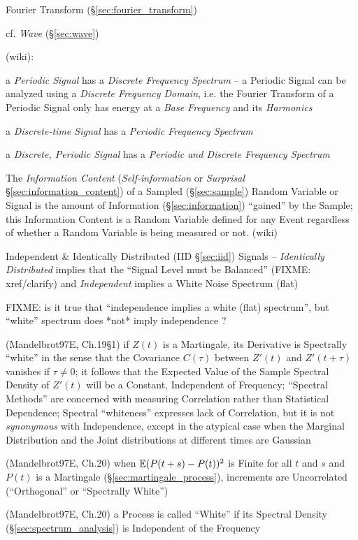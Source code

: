 \fist Fourier Transform (\S\ref{sec:fourier_transform})

cf. \emph{Wave} (\S\ref{sec:wave})

(wiki):

a \emph{Periodic Signal} has a \emph{Discrete Frequency Spectrum} -- a Periodic
Signal can be analyzed using a \emph{Discrete Frequency Domain}, i.e. the
Fourier Transform of a Periodic Signal only has energy at a \emph{Base
  Frequency} and its \emph{Harmonics}

a \emph{Discrete-time Signal} has a \emph{Periodic Frequency Spectrum}

a \emph{Discrete, Periodic Signal} has a \emph{Periodic and Discrete Frequency
  Spectrum}

The \emph{Information Content} (\emph{Self-information} or \emph{Surprisal}
\S\ref{sec:information_content}) of a Sampled (\S\ref{sec:sample}) Random
Variable or Signal is the amount of Information (\S\ref{sec:information})
``gained'' by the Sample; this Information Content is a Random Variable defined
for any Event regardless of whether a Random Variable is being measured or not.
(wiki)

Independent \& Identically Distributed (IID \S\ref{sec:iid}) Signals --
\emph{Identically Distributed} implies that the ``Signal Level must be
Balanced'' (FIXME: xref/clarify) and \emph{Independent} implies a White Noise
Spectrum (flat)

FIXME: is it true that ``independence implies a white (flat) spectrum'',
but ``white'' spectrum does *not* imply independence ?

(Mandelbrot97E, Ch.19\S 1) if $Z(t)$ is a Martingale, its Derivative is
Spectrally ``white'' in the sense that the Covariance $C(\tau)$ between $Z'(t)$
and $Z'(t + \tau)$ vanishes if $\tau \neq 0$; it follows that the Expected Value
of the Sample Spectral Density of $Z'(t)$ will be a Constant, Independent of
Frequency; ``Spectral Methods'' are concerned with measuring Correlation rather
than Statistical Dependence; Spectral ``whiteness'' expresses lack of
Correlation, but it is not \emph{synonymous} with Independence, except in the
atypical case when the Marginal Distribution and the Joint distributions at
different times are Gaussian

(Mandelbrot97E, Ch.20) when $\mathbb{E}(P(t+s) - P(t))^2$ is Finite for all $t$ and
$s$ and $P(t)$ is a Martingale (\S\ref{sec:martingale_process}), increments are
Uncorrelated (``Orthogonal'' or ``Spectrally White'')

(Mandelbrot97E, Ch.20) a Process is called ``White'' if its Spectral Density
(\S\ref{sec:spectrum_analysis}) is Independent of the Frequency



